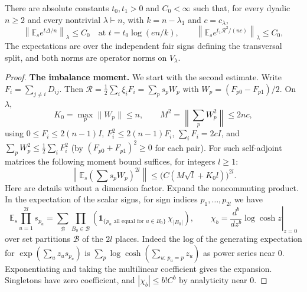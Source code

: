 \begin{lemma}\label{cas:split-moments}
There are absolute constants $t_0,t_1>0$ and $C_0<\infty$ such that,
for every dyadic $n\ge2$ and every nontrivial $\lambda\vdash n$, with
$k=n-\lambda_1$ and $c=c_\lambda$,
\begin{equation}
\left\|\mathbb E_s e^{t\Delta/n}\right\|_\lambda\le C_0
\quad\text{at }t=t_0\log(e n/k),\qquad
\left\|\mathbb E_s e^{t_1\mathcal R^2/(nc)}\right\|_\lambda\le C_0,
\label{cas:e10}
\end{equation}
The expectations are over the independent fair signs defining the
transversal split, and both norms are operator norms on $V_\lambda$.
\end{lemma}
\begin{proof}
\medskip\noindent\textbf{The imbalance moment.}\enspace
We start with the second estimate. Write \(F_i=\sum_{j\ne i} D_{ij}\). Then \(\mathcal R=\tfrac12\sum_i\xi_i F_i=\sum_p s_p W_p\) with \(W_p=(F_{p0}-F_{p1})/2\). On \(\lambda\),
\[
K_0=\max_p\|W_p\|\le n,\qquad M^2=\left\|\sum_p W_p^2\right\|\le 2nc,
\]
using \(0\le F_i\le 2(n-1)I\), \(F_i^2\le2(n-1)F_i\), \(\sum_i F_i=2cI\), and \(\sum_p W_p^2\le \tfrac12\sum_i F_i^2\) (by \((F_{p0}+F_{p1})^2\ge0\) for each pair). For such self-adjoint matrices the following moment bound suffices, for integers \(l\ge1\):
\begin{equation}
\left\|\mathbb E_s(\textstyle\sum s_p W_p)^{2l}\right\|
\le \big(C(M\sqrt l+K_0 l)\big)^{2l}.
\label{cas:e11}
\end{equation}
Here are details without a dimension factor. Expand the noncommuting product. In the expectation of the scalar signs, for sign indices \(p_1,\ldots,p_{2l}\) we have
\[
\mathbb E_s\prod_{u=1}^{2l} s_{p_u}
=\sum_{\mathcal B}\prod_{B_0\in\mathcal B}
   \left(\mathbf1_{\{p_u\text{ all equal for }u\in B_0\}}\,\chi_{|B_0|}\right),
\qquad \chi_b=\left.\frac{d^b}{dz^b}\log\cosh z\right|_{z=0}
\]
over set partitions \(\mathcal B\) of the \(2l\) places. Indeed the log of the generating expectation for \(\exp(\sum_u z_u s_{p_u})\) is \(\sum_p\log\cosh(\sum_{u:\,p_u=p} z_u)\) as power series near 0. Exponentiating and taking the multilinear coefficient gives the expansion. Singletons have zero coefficient, and \(|\chi_b|\le b! C^b\) by analyticity near 0.


\end{proof}
